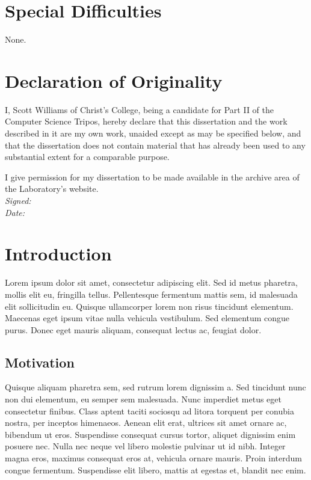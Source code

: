 \documentclass[paper=a4, fontsize=11pt,twoside]{scrartcl}    %
\begin{document}
\section*{Special Difficulties}
None.

\pagebreak
\section*{Declaration of Originality}
I, Scott Williams of Christ's College, being a candidate for Part II of the Computer
Science Tripos, hereby declare that this dissertation and the work described
in it are my own work, unaided except as may be specified below, and that
the dissertation does not contain material that has already been used to any
substantial extent for a comparable purpose.

I give permission for my dissertation to be made available in the archive
area of the Laboratory's website.\\[15pt]
\textit{Signed:}\\[15pt]
\textit{Date:}
\pagebreak

\tableofcontents

\pagebreak
{} 
\section{Introduction}
Lorem ipsum dolor sit amet, consectetur adipiscing elit. Sed id metus pharetra, mollis elit eu, fringilla tellus. Pellentesque fermentum mattis sem, id malesuada elit sollicitudin eu. Quisque ullamcorper lorem non risus tincidunt elementum. Maecenas eget ipsum vitae nulla vehicula vestibulum. Sed elementum congue purus. Donec eget mauris aliquam, consequat lectus ac, feugiat dolor.
\subsection{Motivation}
Quisque aliquam pharetra sem, sed rutrum lorem dignissim a. Sed tincidunt nunc non dui elementum, eu semper sem malesuada. Nunc imperdiet metus eget consectetur finibus. Class aptent taciti sociosqu ad litora torquent per conubia nostra, per inceptos himenaeos. Aenean elit erat, ultrices sit amet ornare ac, bibendum ut eros. Suspendisse consequat cursus tortor, aliquet dignissim enim posuere nec. Nulla nec neque vel libero molestie pulvinar ut id nibh. Integer magna eros, maximus consequat eros at, vehicula ornare mauris. Proin interdum congue fermentum. Suspendisse elit libero, mattis at egestas et, blandit nec enim. 
\end{document}
